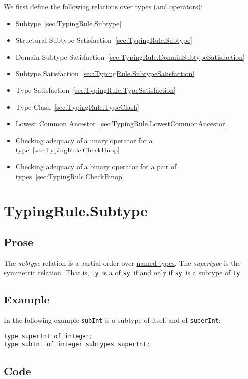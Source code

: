 \documentclass{book}
\newcommand\tty[0]{\texttt{ty}}
\newcommand\tsy[0]{\texttt{sy}}
\begin{document}
We first define the following relations over types (and operators):
\begin{itemize}
  \item Subtype~\ref{sec:TypingRule.Subtype}
  \item Structural Subtype Satisfaction~\ref{sec:TypingRule.Subtype}
  \item Domain Subtype Satisfaction~\ref{sec:TypingRule.DomainSubtypeSatisfaction}
  \item Subtype Satisfaction~\ref{sec:TypingRule.SubtypeSatisfaction}
  \item Type Satisfaction~\ref{sec:TypingRule.TypeSatisfaction}
  \item Type Clash~\ref{sec:TypingRule.TypeClash}
  \item Lowest Common Ancestor~\ref{sec:TypingRule.LowestCommonAncestor}
  \item Checking adequacy of a unary operator for a type~\ref{sec:TypingRule.CheckUnop}
  \item Checking adequacy of a binary operator for a pair of types~\ref{sec:TypingRule.CheckBinop}
\end{itemize}

\section{TypingRule.Subtype\label{sec:TypingRule.Subtype}}

  \subsection{Prose}
The \emph{subtype} relation is a partial order over \underline{named types}.
The \emph{supertype} is the symmetric relation. That is, \tty\ is a  of \tsy\ if and only if \tsy\ is a subtype of \tty.

  \subsection{Example}
In the following example \texttt{subInt} is a subtype of itself and of \texttt{superInt}:
\begin{verbatim}
type superInt of integer;
type subInt of integer subtypes superInt;
\end{verbatim}
 
  \subsection{Code}
\end{document}
